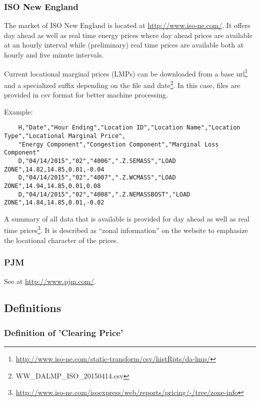 \subsubsection{ISO New England}

The market of ISO New England is located at \url{http://www.iso-ne.com/}. It offers day ahead as well as real time energy prices where day ahead prices are available at an hourly interval while (preliminary) real time prices are available both at hourly and five minute intervals. 

Current locational marginal prices (LMPs) can be downloaded from a base url\footnote{\url{http://www.iso-ne.com/static-transform/csv/histRpts/da-lmp/}} and a specialized suffix depending on the file and date\footnote{WW\_DALMP\_ISO\_20150414.csv}. In this case, files are provided in csv format for better machine processing. 

Example: 
\begin{verbatim}
	H,"Date","Hour Ending","Location ID","Location Name","Location Type","Locational Marginal Price",
	"Energy Component","Congestion Component","Marginal Loss Component"
	D,"04/14/2015","02","4006",".Z.SEMASS","LOAD ZONE",14.82,14.85,0.01,-0.04
	D,"04/14/2015","02","4007",".Z.WCMASS","LOAD ZONE",14.94,14.85,0.01,0.08
	D,"04/14/2015","02","4008",".Z.NEMASSBOST","LOAD ZONE",14.84,14.85,0.01,-0.02
\end{verbatim}

A summary of all data that is available is provided for day ahead as well as real time prices\footnote{\url{http://www.iso-ne.com/isoexpress/web/reports/pricing/-/tree/zone-info}}. It is described as ``zonal information'' on the website to emphasize the locational character of the prices. 



\subsubsection{PJM}

See at \url{http://www.pjm.com/}. 



\subsection{Definitions}

\subsubsection{Definition of 'Clearing Price'}

